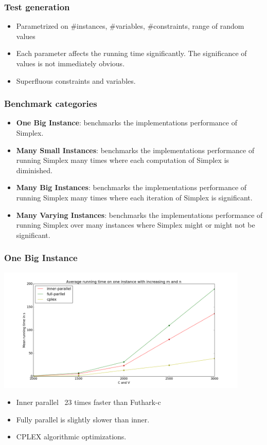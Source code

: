\documentclass[handout]{beamer}
\begin{document}

\begin{frame}
	\frametitle{Test generation}
	\begin{itemize}
		\item Parametrized on \#instances, \#variables, \#constraints, range of random values
		
		\item Each parameter affects the running time significantly. The significance of values is not immediately obvious.
		
		\item Superfluous constraints and variables.
	\end{itemize}
\end{frame}

\begin{frame}
\frametitle{Benchmark categories}
\begin{itemize}
	\item \textbf{One Big Instance}: benchmarks the implementations performance of Simplex.
	
	\item \textbf{Many Small Instances}: benchmarks the implementations performance of running Simplex many times where each computation of Simplex is diminished.
	
	\item \textbf{Many Big Instances}: benchmarks the implementations performance of running Simplex many times where each iteration of Simplex is significant. 
	
	\item \textbf{Many Varying Instances}: benchmarks the implementations performance of running Simplex over many instances where Simplex might or might not be significant. 
\end{itemize}
\end{frame}

\begin{frame}[fragile]
\frametitle{One Big Instance}
\centering
\includegraphics[width=0.9\textwidth]{../Doc/figures/one-big-new}
\begin{itemize}
	\item Inner parallel ~23 times faster than Futhark-c
	\item Fully parallel is slightly slower than inner. 
	\item CPLEX algorithmic optimizations.
\end{itemize}
\end{frame}
\end{document}
